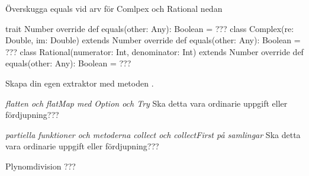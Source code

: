 \Task \TODO Överskugga equals vid arv för Comlpex och Rational nedan

\begin{Code}
trait Number {
  override def equals(other: Any): Boolean = ???
}
class Complex(re: Double, im: Double) extends Number {
  override def equals(other: Any): Boolean = ???
}
class Rational(numerator: Int, denominator: Int) extends Number {
  override def equals(other: Any): Boolean = ???
}
\end{Code}
    

\Task \TODO \label{task:extractor} Skapa din egen extraktor med metoden .

\Task \TODO \emph{flatten och flatMap med Option och Try} 
Ska detta vara ordinarie uppgift eller fördjupning???


\Task \TODO \emph{partiella funktioner och metoderna collect och collectFirst på samlingar} 
Ska detta vara ordinarie uppgift eller fördjupning???

\Task \TODO Plynomdivision ???





